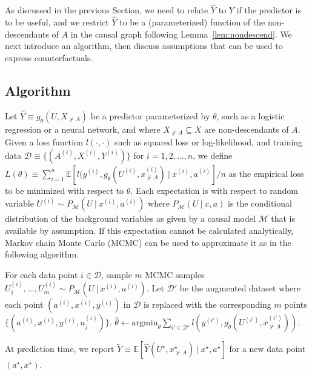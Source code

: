 
As discussed in the previous Section, we need to relate $\hat Y$ to
$Y$ if the predictor is to be useful, and  we restrict
$\hat Y$ to be a (parameterized) function of the non-descendants of
$A$ in the causal graph following
Lemma~\ref{lem:nondescend}. We next introduce an algorithm, then
discuss assumptions that
can be used to express counterfactuals.

\subsection{Algorithm}
\label{sec:algorithm}

Let $\hat Y \equiv g_\theta(U, X_{\nsucc A})$ be a predictor
parameterized by $\theta$, such as a logistic regression or a neural
network, and where $X_{\nsucc A} \subseteq X$ are non-descendants of
$A$. Given a loss function $l(\cdot, \cdot)$ such as squared loss or
log-likelihood, and training data $\mathcal D \equiv \{(A^{(i)}, X^{(i)}, Y^{(i)})\}$
for $i = 1, 2, \dots, n$, we define $L(\theta) \equiv \sum_{i =
  1}^n \mathbb E[l(y^{(i)}, g_\theta(U^{(i)}, x^{(i)}_{\nsucc
    A})\ |\ x^{(i)}, a^{(i)}] / n$ as the empirical loss to be
minimized with respect to $\theta$.  Each expectation is with respect
to random variable $U^{(i)} \sim P_{\mathcal M}(U\ |\ x^{(i)},
a^{(i)})$ where $P_{\mathcal M}(U\ |\ x, a)$ is the conditional
distribution of the background variables as given by a causal model
$\mathcal M$ that is available by assumption. If this expectation
cannot be calculated analytically, Markov chain Monte Carlo (MCMC) can
be used to approximate it as in the following algorithm.
  
\begin{algorithmic}[1]
  \State For each data point $i \in \mathcal D$, sample $m$ MCMC samples
  $U_1^{(i)}, \dots, U_m^{(i)} \sim P_{\mathcal M}(U\ |\ x^{(i)},a^{(i)})$.
  \State Let $\mathcal D'$ be the augmented dataset where each point
  $(a^{(i)}, x^{(i)}, y^{(i)})$ in $\mathcal D$ is replaced with the corresponding $m$ points
  $\{(a^{(i)}, x^{(i)}, y^{(i)}, u_j^{(i)})\}$.
  \State $\hat \theta \leftarrow \mathrm{argmin}_\theta \sum_{i' \in \mathcal D'}
                                   l(y^{(i')}, g_\theta(U^{(i')}, x^{(i')}_{\nsucc A}))$.
\EndProcedure
\end{algorithmic}

At prediction time, we report $\tilde Y \equiv \mathbb E[\hat Y(U^\star,
  x^\star_{\nsucc A})\ |\ x^\star, a^\star]$ for a new data point $(a^\star,
x^\star)$.

